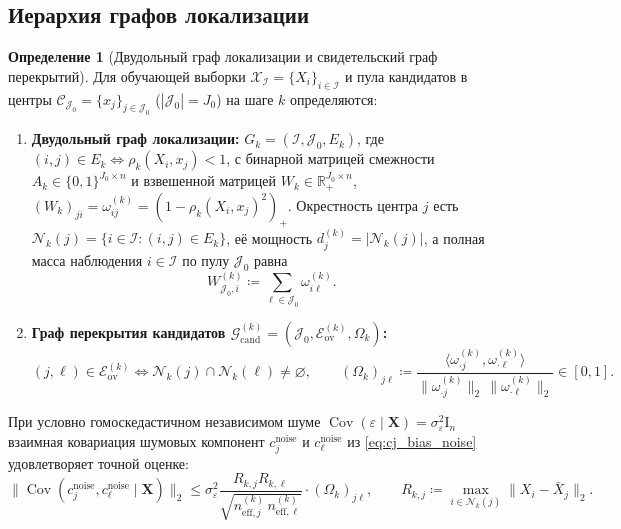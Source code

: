 \documentclass[11pt,a4paper]{article}
\newcommand{\R}{\mathbb{R}}
\newcommand{\Cov}{\operatorname{Cov}}
\newcommand{\Id}{\mathrm{I}}
\newcommand{\II}{\mathcal{I}}
\newcommand{\JJJ}{\mathcal{J}}
\theoremstyle{definition}
\newtheorem{definition}[theorem]{Определение}
\theoremstyle{remark}
\begin{document}
\subsection{Иерархия графов локализации}

\begin{definition}[Двудольный граф локализации и свидетельский граф перекрытий]\label{def:graphs}
Для обучающей выборки $\mathcal{X}_{\II} = \{X_i\}_{i \in \II}$ и пула кандидатов в центры $\mathcal{C}_{\JJJ_0} = \{x_j\}_{j \in \JJJ_0}$ ($|\JJJ_0| = J_0$) на шаге $k$ определяются:
\begin{enumerate}
    \item \textbf{Двудольный граф локализации:} $G_k = (\II, \JJJ_0, E_k)$, где $(i, j) \in E_k \iff \rho_k(X_i, x_j) < 1$, с бинарной матрицей смежности $A_k \in \{0,1\}^{J_0 \times n}$ и взвешенной матрицей $W_k \in \R_+^{J_0 \times n}$, $(W_k)_{ji} = \omega_{ij}^{(k)} = (1 - \rho_k(X_i, x_j)^2)_+$. Окрестность центра $j$ есть $\mathcal{N}_k(j) = \{i \in \II : (i,j) \in E_k\}$, её мощность $d_j^{(k)} = |\mathcal{N}_k(j)|$, а полная масса наблюдения $i \in \II$ по пулу $\JJJ_0$ равна
    \begin{equation}\label{eq:W_pool_obs}
        W_{\JJJ_0, i}^{(k)} \coloneqq \sum_{\ell \in \JJJ_0} \omega_{i\ell}^{(k)}.
    \end{equation}
    \item \textbf{Граф перекрытия кандидатов $\mathcal{G}_{\mathrm{cand}}^{(k)} = (\JJJ_0, \mathcal{E}_{\mathrm{ov}}^{(k)}, \Omega_k)$:}
    \begin{equation}\label{eq:omega_overlap}
        (j, \ell) \in \mathcal{E}_{\mathrm{ov}}^{(k)} \iff \mathcal{N}_k(j) \cap \mathcal{N}_k(\ell) \neq \varnothing, \qquad (\Omega_k)_{j\ell} \coloneqq \frac{\langle \omega_{\cdot j}^{(k)}, \omega_{\cdot \ell}^{(k)} \rangle}{\|\omega_{\cdot j}^{(k)}\|_2 \, \|\omega_{\cdot \ell}^{(k)}\|_2} \in [0, 1].
    \end{equation}
\end{enumerate}
\end{definition}

При условно гомоскедастичном независимом шуме $\Cov(\varepsilon \mid \mathbf{X}) = \sigma_\varepsilon^2 \Id_n$ взаимная ковариация шумовых компонент $c_j^{\mathrm{noise}}$ и $c_\ell^{\mathrm{noise}}$ из \eqref{eq:cj_bias_noise} удовлетворяет точной оценке:
\begin{equation}\label{eq:cov_bound_omega}
    \bigl\|\Cov(c_j^{\mathrm{noise}}, c_\ell^{\mathrm{noise}} \mid \mathbf{X})\bigr\|_2 \le \sigma_\varepsilon^2 \frac{R_{k,j} R_{k,\ell}}{\sqrt{n_{\mathrm{eff},j}^{(k)} \, n_{\mathrm{eff},\ell}^{(k)}}} \cdot (\Omega_k)_{j\ell}, \qquad R_{k,j} \coloneqq \max_{i \in \mathcal{N}_k(j)} \|X_i - \bar{X}_j\|_2.
\end{equation}
\end{document}
